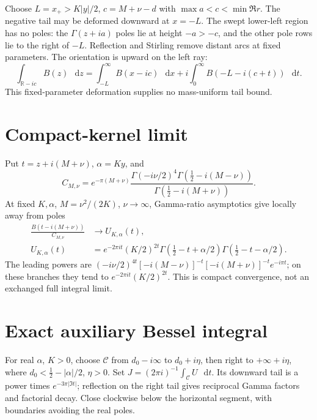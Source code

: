 \documentclass[11pt,a4paper]{article}
\newcommand{\dd}{\mathop{}\!\mathrm d}
\begin{document}
Choose \(L=x_+>K|y|/2\), \(c=M+\nu-d\) with
\(\max a<c<\min\Re r\). The negative tail may be deformed downward
at \(x=-L\). The swept lower-left region has no poles:
the \(\Gamma(z+ia)\) poles lie at height \(-a>-c\), and the other
pole rows lie to the right of \(-L\).
Reflection and Stirling remove distant arcs at fixed parameters.
The orientation is upward on the left ray:
\[
 \int_{\mathbb R-ic}B(z)\,\dd z
 =\int_{-L}^\infty B(x-ic)\,\dd x
 +i\int_0^\infty B(-L-i(c+t))\,\dd t.
\]
This fixed-parameter deformation supplies no mass-uniform tail bound.

\section{Compact-kernel limit}
Put \(t=z+i(M+\nu)\), \(\alpha=Ky\), and
\[
 C_{M,\nu}=e^{-\pi(M+\nu)}
 \frac{\Gamma(-i\nu/2)^4\Gamma(\tfrac12-i(M-\nu))}
 {\Gamma(\tfrac12-i(M+\nu))}.
\]
At fixed \(K,\alpha\), \(M=\nu^2/(2K)\), \(\nu\to\infty\),
Gamma-ratio asymptotics \cite{stirling} give locally away from poles
\begin{align}
 \frac{B(t-i(M+\nu))}{C_{M,\nu}}&\longrightarrow U_{K,\alpha}(t),\\
 U_{K,\alpha}(t)&=e^{-2\pi it}(K/2)^{2t}
 \Gamma(\tfrac12-t+\alpha/2)\Gamma(\tfrac12-t-\alpha/2).
\end{align}
The leading powers are
\(( -i\nu/2)^{4t}[-i(M-\nu)]^{-t}[-i(M+\nu)]^{-t}e^{-i\pi t}\);
on these branches they tend to \(e^{-2\pi it}(K/2)^{2t}\).
This is compact convergence, not an exchanged full integral limit.

\newpage
\section{Exact auxiliary Bessel integral}
For real \(\alpha\), \(K>0\), choose \(\mathcal C\) from
\(d_0-i\infty\) to \(d_0+i\eta\), then right to \(+\infty+i\eta\),
where \(d_0<\tfrac12-|\alpha|/2\), \(\eta>0\).
Set \(J=(2\pi i)^{-1}\int_{\mathcal C}U\,\dd t\).
Its downward tail is a power times \(e^{-3\pi|\Im t|}\);
reflection on the right tail gives reciprocal Gamma factors and
factorial decay. Close clockwise below the horizontal segment,
with boundaries avoiding the real poles.
\end{document}
